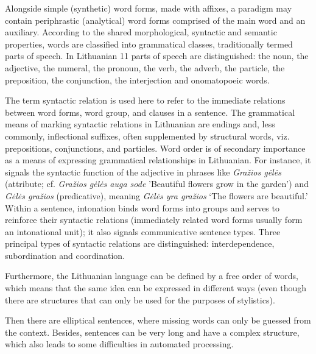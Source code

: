 \begin{multicols}{2}

Alongside simple (synthetic) word forms, made with affixes, a paradigm may contain periphrastic (analytical) word forms comprised of the main word and an auxiliary.
    According to the shared morphological, syntactic and semantic properties, words are classified into grammatical classes, traditionally termed parts of speech. In Lithuanian 11 parts of speech are distinguished: the noun, the adjective, the numeral, the pronoun, the verb, the adverb, the particle, the preposition, the conjunction, the interjection and onomatopoeic words.

    The term syntactic relation is used here to refer to the immediate relations between word forms, word group, and clauses in a sentence. The grammatical means of marking syntactic relations in Lithuanian are endings and, less commonly, inflectional suffixes, often supplemented by structural words, viz. prepositions, conjunctions, and particles. Word order is of secondary importance as a means of expressing grammatical relationships in Lithuanian. For instance, it signals the syntactic function of the adjective in phrases like \textit{Gražios gėlės} (attribute; cf. \textit{Gražios gėlės auga sode} 'Beautiful flowers grow in the garden') and \textit{Gėlės gražios} (predicative), meaning \textit{Gėlės yra gražios} ‘The flowers are beautiful.' Within a sentence, intonation binds word forms into groups and serves to reinforce their syntactic relations (immediately related word forms usually form an intonational unit); it also signals communicative sentence types. Three principal types of syntactic relations are distinguished: interdependence, subordination and coordination.

    Furthermore, the Lithuanian language can be defined by a free order of words, which means that the same idea can be expressed in different ways (even though there are structures that can only be used for the purposes of stylistics).

Then there are elliptical sentences, where missing words can only be guessed from the context. Besides, sentences can be very long and have a complex structure, which also leads to some difficulties in automated processing.



\end{multicols}
